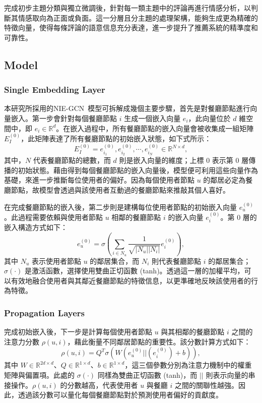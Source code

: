     完成初步主題分類與獨立微調後，針對每一類主題中的評論再進行情感分析，以判斷其情感取向為正面或負面。這一分層且分主題的處理架構，能夠生成更為精確的特徵向量，使得每條評論的語意信息充分表達，進一步提升了推薦系統的精準度和可靠性。

\subsection{Model}
    \subsubsection{Single Embedding Layer}
        本研究所採用的NIE-GCN\cite{NIE-GCN}~模型可拆解成幾個主要步驟，首先是對餐廳節點進行向量嵌入。第一步會針對每個餐廳節點 $i$ 生成一個嵌入向量 $e_i$，此向量位於 $d$ 維空間中，即 $e_i \in \mathbb{R}^d$。在嵌入過程中，所有餐廳節點的嵌入向量會被收集成一組矩陣 $E_I^{(0)}$，此矩陣表達了所有餐廳節點的初始嵌入狀態，如下式所示： 
        \begin{equation} 
            E_I^{(0)} = {e_{i_1}^{(0)}, e_{i_2}^{(0)},\cdots,e_{i_N}^{(0)}} \in \mathbb{R}^{N \times d}, 
        \end{equation}
        其中，$N$ 代表餐廳節點的總數，而 $d$ 則是嵌入向量的維度；上標 $0$ 表示第 0 層傳播的初始狀態。藉由得到每個餐廳節點的嵌入向量後，模型便可利用這些向量作為基礎，來進一步推斷每位使用者的偏好。因為每個使用者節點 $u$ 的鄰居必定為餐廳節點，故模型會透過與該使用者互動過的餐廳節點來推敲其個人喜好。

        在完成餐廳節點的嵌入後，第二步則是建構每位使用者節點的初始嵌入向量 $e_u^{(0)}$。此過程需要依賴與使用者節點 $u$ 相鄰的餐廳節點 $i$ 的嵌入向量 $e_i^{(0)}$。第 0 層的嵌入構造方式如下： 
        \begin{equation} 
            e_u^{(0)} = \sigma \left(\sum_{i \in N_u} \frac{1}{\sqrt{\vert N_u \vert \vert N_i \vert}}e_i^{(0)}\right), 
            \label{eq-e_u^0}
        \end{equation} 
        其中 $N_u$ 表示使用者節點 $u$ 的鄰居集合，而 $N_i$ 則代表餐廳節點 $i$ 的鄰居集合；$\sigma(\cdot)$ 是激活函數，選擇使用雙曲正切函數 (tanh)。透過這一層的加權平均，可以有效地融合使用者與其鄰近餐廳節點的特徵信息，以更準確地反映該使用者的行為特徵。

    \subsubsection{Propagation Layers}
    完成初始嵌入後，下一步是計算每個使用者節點 $u$ 與其相鄰的餐廳節點 $i$ 之間的注意力分數 $\rho(u, i)$，藉此衡量不同鄰居節點的重要性。該分數計算方式如下： 
    \begin{equation} 
        \rho(u, i) = Q^T\sigma(W(e_u^{(0)}||(e_i^{(0)})+b)), 
    \end{equation} 
    其中 $W \in \mathbb{R}^{2d \times d}$、$Q \in \mathbb{R}^{1 \times d}$、$b \in \mathbb{R}^{1 \times d}$，這三個參數分別為注意力機制中的權重矩陣與偏置項。此處的 $\sigma(\cdot)$ 同樣為雙曲正切函數 (tanh)，而 $||$ 則表示向量的串接操作。$\rho(u, i)$ 的分數越高，代表使用者 $u$ 與餐廳 $i$ 之間的關聯性越強。因此，透過該分數可以量化每個餐廳節點對於預測使用者偏好的貢獻度。

